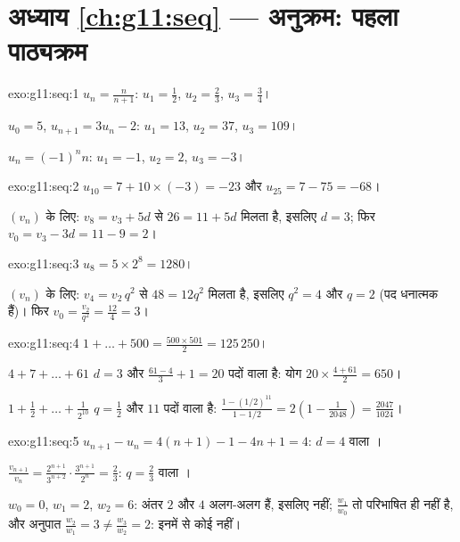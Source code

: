 \section*{अध्याय \ref{ch:g11:seq} --- अनुक्रम: पहला पाठ्यक्रम}

\begin{solution}{exo:g11:seq:1}
$u_n = \frac{n}{n+1}$: $u_1 = \frac12$, $u_2 = \frac23$, $u_3 = \frac34$।

$u_0 = 5$, $u_{n+1} = 3u_n - 2$: $u_1 = 13$, $u_2 = 37$, $u_3 = 109$।

$u_n = (-1)^n n$: $u_1 = -1$, $u_2 = 2$, $u_3 = -3$।
\end{solution}

\begin{solution}{exo:g11:seq:2}
$u_{10} = 7 + 10 \times (-3) = -23$ और $u_{25} = 7 - 75 = -68$।

$(v_n)$ के लिए: $v_8 = v_3 + 5d$ से $26 = 11 + 5d$ मिलता है, इसलिए $d = 3$; फिर $v_0 = v_3 - 3d = 11 - 9 = 2$।
\end{solution}

\begin{solution}{exo:g11:seq:3}
$u_8 = 5 \times 2^8 = 1280$।

$(v_n)$ के लिए: $v_4 = v_2\, q^2$ से $48 = 12 q^2$ मिलता है, इसलिए $q^2 = 4$ और $q = 2$ (पद धनात्मक हैं)।
फिर $v_0 = \frac{v_2}{q^2} = \frac{12}{4} = 3$।
\end{solution}

\begin{solution}{exo:g11:seq:4}
$1 + \dots + 500 = \frac{500 \times 501}{2} = 125\,250$।

$4 + 7 + \dots + 61$ $d = 3$ और $\frac{61 - 4}{3} + 1 = 20$ पदों वाला  है: योग $20 \times \frac{4 + 61}{2} = 650$।

$1 + \frac12 + \dots + \frac{1}{2^{10}}$ $q = \frac12$ और $11$ पदों वाला  है: $\frac{1 - (1/2)^{11}}{1 - 1/2} = 2\left(1 - \frac{1}{2048}\right)
= \frac{2047}{1024}$।
\end{solution}

\begin{solution}{exo:g11:seq:5}
$u_{n+1} - u_n = 4(n+1) - 1 - 4n + 1 = 4$: $d = 4$ वाला ।

$\frac{v_{n+1}}{v_n} = \frac{2^{n+1}}{3^{n+2}} \cdot \frac{3^{n+1}}{2^n}
= \frac23$: $q = \frac23$ वाला ।

$w_0 = 0$, $w_1 = 2$, $w_2 = 6$: अंतर $2$ और $4$ अलग-अलग हैं, इसलिए  नहीं; $\frac{w_1}{w_0}$ तो
परिभाषित ही नहीं है, और अनुपात $\frac{w_2}{w_1} = 3 \neq \frac{w_3}{w_2} = 2$: इनमें से कोई नहीं।
\end{solution}

